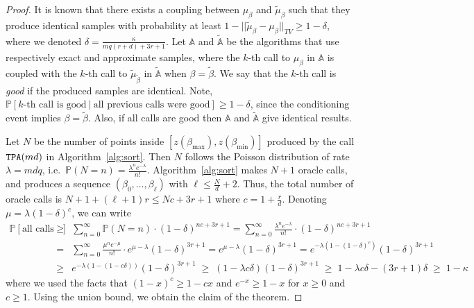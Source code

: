 \documentclass[final,12pt]{colt2018}
\def\bmin{{\beta_{\min}}}
\def\bmax{{\beta_{\max}}}
\def\P{{\mathbb P}}
\begin{document}
\begin{proof}
It is known that there exists a coupling between $\mu_\beta$ and $\tilde\mu_\beta$ such that 
they produce identical samples with probability at least $1-||\tilde\mu_\beta-\mu_\beta||_{TV}\ge 1-\delta$,
where we denoted $\delta=\frac{\kappa}{mq(r+d)+3r+1}$. 
Let ${\mathbb A}$ and $\tilde{\mathbb A}$ be the algorithms that use respectively exact and approximate samples,
where the $k$-th call to $\mu_\beta$ in ${\mathbb A}$ is coupled with the $k$-th call to $\tilde\mu_{\tilde\beta}$ in $\tilde{\mathbb A}$
when $\beta=\tilde\beta$.
We say that  the $k$-th call is {\em good} if the produced samples are identical.
Note, $\P[\mbox{$k$-th call is good}\:|\:\mbox{all previous calls were good}]\ge 1-\delta$, since the conditioning 
event implies $\beta=\tilde\beta$.
Also, if all calls are good then ${\mathbb A}$ and $\tilde{\mathbb A}$ give identical results.

Let $N$ be the number of points inside $[z(\bmax),z(\bmin)]$ produced by the call ${\tt TPA}(md)$ in Algorithm~\ref{alg:sort}.
Then $N$ follows the Poisson distribution of rate $\lambda=mdq$, i.e.\ 
$\P(N=n)=\frac{\lambda^{n}e^{-\lambda}}{n !}$.
Algorithm~\ref{alg:sort} makes $N+1$ oracle calls, and produces a sequence $(\beta_0,\ldots,\beta_\ell)$ 
with $\ell\le \frac{N}{d}+2$.
Thus, the total number of oracle calls is $N+1+(\ell+1)r\le Nc+3r+1$ where $c=1+\frac{r}{d}$.
Denoting $\mu=\lambda(1-\delta)^c$, we can write
\begin{eqnarray*}
\P[\mbox{all calls are good}]
& \!\ge\! & \sum_{n=0}^{\infty} \P(N=n)\cdot (1\!-\!\delta)^{nc+3r+1}
= \sum_{n=0}^{\infty}  \frac{\lambda^{n}e^{-\lambda}}{n !} \cdot (1\!-\!\delta)^{n c+3r+1}
\\
& \!=\! & \sum_{n=0}^{\infty}  \frac{\mu^{n}e^{-\mu}}{n !} \cdot e^{\mu - \lambda}(1\!-\!\delta)^{3r+1}
=e^{\mu-\lambda}(1\!-\!\delta)^{3r+1}
=e^{-\lambda\left(1-(1-\delta)^c\right)}(1\!-\!\delta)^{3r+1} \\
%
%
& \!\ge\! & e^{-\lambda\left(1-(1-c\delta)\right)}(1\!-\!\delta)^{3r+1}
\;\ge\; (1\!-\!\lambda c \delta) (1\!-\!\delta)^{3r+1}
\;\ge\; 1 \!-\! \lambda c \delta \!-\! (3r\!+\!1)\delta
\;\ge\; 1 \!-\! \kappa
\end{eqnarray*}
where we used the facts that $(1-x)^c\ge 1-cx$ and $e^{-x}\ge 1-x$ for $x\ge 0$ and $c\ge 1$.
Using the union bound, we obtain the claim of the theorem.
\end{proof}

\newcommand{\zdiff}{z_{\tt diff}}
\newcommand{\I}{\mathbb I}
\end{document}
